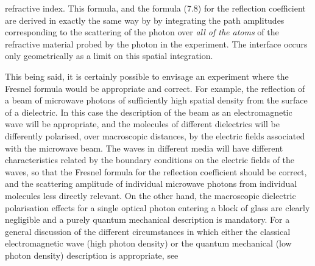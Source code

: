 {   refractive index. This formula, and the formula (7.8) for the reflection coefficient
  are derived in exactly the same way by by integrating the path amplitudes corresponding
   to the scattering of the photon over {\it all of the atoms} of the refractive
   material probed by the photon in the experiment. The interface occurs only geometrically
  as a limit on this spatial integration.
  \par  This being said, it is certainly possible to envisage an experiment where the Fresnel
  formula would be appropriate and correct. For example, the reflection of a beam
   of microwave photons of sufficiently high spatial density from the surface 
  of a dielectric. In this case the description of the beam as an electromagnetic wave will be 
  appropriate, and the molecules of different dielectrics will be differently polarised, over macroscopic
  distances,
  by the electric fields associated with the microwave beam. The waves in different media will
  have different characteristics related by the boundary conditions on the electric fields
  of the waves, so that the Fresnel formula for the reflection coefficient should be 
  correct, and the scattering amplitude of individual microwave photons from individual
  molecules less directly relevant. On the other hand, the macroscopic dielectric polarisation effects
  for a single optical photon entering a block of glass are clearly negligible and a purely
  quantum mechanical description is mandatory. For a general discussion of the different circumstances
  in which either the classical electromagnetic wave (high photon density) or the quantum
  mechanical (low photon density) description is appropriate, see ~\cite{JHF6}

}
